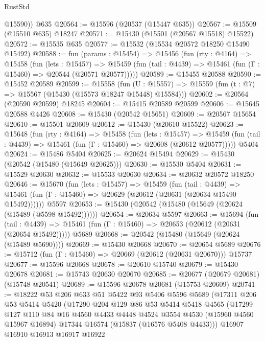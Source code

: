 \begin{lexlean}{RustStd}
\begin{coremodule}
        @15590))
    @635
@20564 := @15596 (@20537 (@15447 @635))
@20567 := @15509 (@15510 @635) @18247
@20571 := @15430 (@15501 (@20567 @15518) @15522)
@20572 := @15535 @635
@20577 := @15532 (@15534 @20572 @18250 @15490 @15492)
@20588 := fun (params : @15454) =>
  @15456
    (fun (rty : @4164) =>
    @15458
      (fun (lets : @15457) =>
      @15459 (fun (tail : @4439) => @15461 (fun (Γ : @15460) => @20544 (@20571 @20577)))))
@20589 := @15455 @20588
@20590 := @15452 @20589
@20599 := @15558
    (fun (U : @15557) => @15559 (fun (t : @7) => @15567 (@15430 (@15573 @18247 @15448) @15584)))
@20602 := @20564 (@20590 @20599) @18245
@20604 := @15415 @20589 @20599
@20606 := @15645 @20588 @4426
@20608 := @15430 (@20542 @15651)
@20609 := @20567 @15654
@20610 := @15501 @20609
@20612 := @15430 (@20610 @15522)
@20623 := @15648
    (fun (rty : @4164) =>
    @15458
      (fun (lets : @15457) =>
      @15459 (fun (tail : @4439) => @15461 (fun (Γ : @15460) => @20608 (@20612 @20577)))))
    @5404
@20624 := @15486 @5404
@20625 := @20624 @15494
@20629 := @15430 (@20542 (@15480 (@15649 @20625)))
@20630 := @15530 @5404
@20631 := @15529 @20630
@20632 := @15533 @20630
@20634 := @20632 @20572 @18250
@20646 := @15670
    (fun (lets : @15457) =>
    @15459
      (fun (tail : @4439) =>
      @15461 (fun (Γ : @15460) => @20629 (@20612 (@20631 (@20634 @15490 @15492))))))
    @5597
@20653 := @15430 (@20542 (@15480 (@15649 (@20624 (@15489 (@5598 @15492))))))
@20654 := @20634 @5597
@20663 := @15694
    (fun (tail : @4439) => @15461 (fun (Γ : @15460) => @20653 (@20612 (@20631 (@20654 @15492)))))
    @5689
@20668 := @20542 (@15480 (@15649 (@20624 (@15489 @5690))))
@20669 := @15430 @20668
@20670 := @20654 @5689
@20676 := @15712 (fun (Γ : @15460) => @20669 (@20612 (@20631 @20670))) @15737
@20677 := @15596 @20668
@20678 := @20610 @15740
@20679 := @15430 @20678
@20681 := @15743 @20630 @20670
@20685 := @20677 (@20679 @20681) (@15748 @20541)
@20689 := @15596 @20678 @20681 (@15753 @20609)
@20741 := @18222
    @53
    @206
    @633
    @51
    @5422
    @93
    @5406
    @5596
    @5689
    (@17311
      @206
      @53
      @5414
      @5420
      (@17290
        @204
        @129
        @86
        @53
        @5414
        @5418
        @4565
        (@17299
          @127
          @110
          @84
          @16
          @4560
          @4433
          @4448
          @4524
          @3554
          @4530
          (@15960 @4560 @15967 @16894)
          @17344
          @16574
          (@15837 (@16576 @5408 @4433)))
        @16907
        @16910
        @16913
        @16917
        @16922

\end{coremodule}
\end{lexlean}
